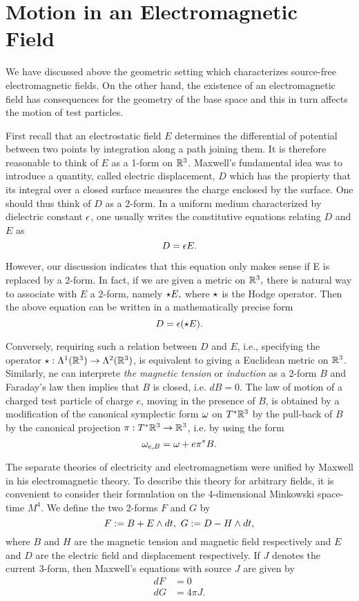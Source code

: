 \section{Motion in an Electromagnetic Field}

We have discussed above the geometric setting which characterizes source-free electromagnetic fields. On the other
hand, the existence of an electromagnetic field has consequences for the geometry of the base space and this in turn
affects the motion of test particles.

First recall that an electrostatic field $E$ determines the differential of potential between two points by integration
along a path joining them. It is therefore reasonable to think of $E$ as a 1-form on $\mathbb R^{3}$. Maxwell's fundamental
idea was to introduce a quantity, called electric displacement, $D$ which has the propierty that its integral over a
closed surface measures the charge enclosed by the surface. One should thus think of $D$ as a 2-form. In a uniform
medium characterized by dielectric constant $\epsilon$, one usually writes the constitutive equations relating $D$ and $E$ as
$$
D=\epsilon E.
$$

However, our discussion indicates that this equation only makes sense if E is replaced by a 2-form. In fact, if we are
given a metric on $\mathbb R^{3},$ there is natural way to associate with $E$ a 2-form, namely $\star E,$ where $\star$ is the
Hodge operator. Then the above equation can be written in a mathematically precise form
$$
D=\epsilon(\star E).
$$

Conversely, requiring such a relation between $D$ and $E$, i.e., specifying the operator $\star: \Lambda^{1}(\mathbb R^{3}) \to
\Lambda^{2}(\mathbb R^{3})$, is equivalent to giving a Euclidean metric on $\mathbb R^{3}$. Similarly, ne can interprete \emph{the
magnetic tension} or \emph{induction} as a 2-form $B$ and Faraday's law then implies that $B$ is closed, i.e. $dB=0.$
The law of motion of a charged test particle of charge $e$, moving in the presence of $B$, is obtained by a
modification of the canonical symplectic form $\omega$ on $T^{*}\mathbb R^{3}$ by the pull-back of $B$ by the canonical
projection $\pi: T^{*}\mathbb R^{3} \to \mathbb R^{3}$, i.e. by using the form 
$$
\omega_{e,B}=\omega + e\pi^{*}B.
$$

The separate theories of electricity and electromagnetism were unified by Maxwell in his electromagnetic theory. To
describe this theory for arbitrary fields, it is convenient to consider their formulation on the 4-dimensional
Minkowski space-time $M^{4}.$ We define the two 2-forms $F$ and $G$ by
$$
F:=B+E \wedge dt, \ G:=D-H\wedge dt,
$$
where $B$ and $H$ are the magnetic tension and magnetic field respectively and $E$ and $D$ are the electric field and
displacement respectively. If $J$ denotes the current 3-form, then Maxwell's equations with source $J$ are given by
\begin{align*}
 dF&=0\\
dG & = 4 \pi J.
\end{align*}
 
